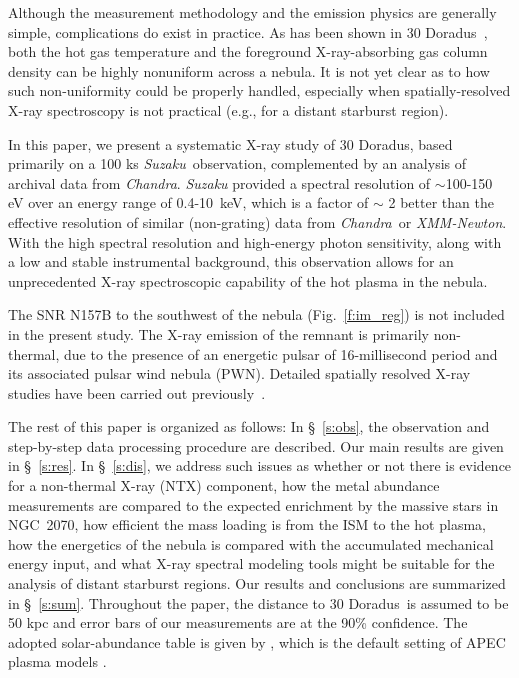 \documentclass[usenatbib]{mnras}
\def\xs{30 Doradus}
\def\suzaku{{\sl Suzaku}}
\def\chandra{{\sl Chandra}}
\begin{document}
Although the measurement methodology and the emission physics are generally simple, complications do exist in practice. As has been shown in \xs\ \citep[e.g.][]{Townsley1}, both the hot gas temperature and the foreground X-ray-absorbing gas column density can be highly nonuniform across a nebula. 
It is not yet clear as to how such non-uniformity could be properly handled, especially when spatially-resolved X-ray spectroscopy is not practical (e.g., for a distant starburst region). 

In this paper, we present a systematic X-ray study of \xs, based primarily on a 100 ks \suzaku\ observation, complemented by an analysis of archival data from \chandra. \textit{Suzaku} provided a spectral resolution of $\sim$100-150 eV over an energy range of 0.4-10~keV, which is a factor of $\sim$ 2 better than the effective resolution of similar (non-grating) data from \chandra\ or \textit{XMM-Newton}. With the high spectral resolution and high-energy photon sensitivity, along with a low and stable instrumental background, this observation allows for an unprecedented X-ray spectroscopic capability of the hot plasma in the nebula. 

The SNR N157B to the southwest of the nebula (Fig.~\ref{f:im_reg}) is not included in the present study. The X-ray emission of the remnant is primarily non-thermal, due to the presence of an energetic pulsar of 16-millisecond period and its associated pulsar wind nebula (PWN). Detailed spatially resolved X-ray studies have been carried out previously~\citep[e.g.][]{Chen2006}. 

The rest of this paper is organized as follows: In \S~\ref{s:obs}, the observation and step-by-step data processing procedure are described. Our main results are given in \S~\ref{s:res}. In \S~\ref{s:dis}, we address such issues as whether or not there is evidence for a non-thermal X-ray (NTX) component, how the metal abundance measurements are compared to the
expected enrichment by the massive stars in NGC~2070, how efficient the mass loading is from the ISM to the hot plasma, how the energetics of the nebula is compared with the accumulated mechanical energy input, and what X-ray spectral modeling tools might be suitable for the analysis of distant starburst regions. Our results and conclusions are summarized in \S~\ref{s:sum}. Throughout the paper, the distance to \xs\ is assumed to be 50 kpc and error bars of our measurements are at the 90\% confidence. The adopted solar-abundance table is given by \citet{Anders}, which is the default setting of APEC plasma models \citep{Smith}. 
\end{document}
